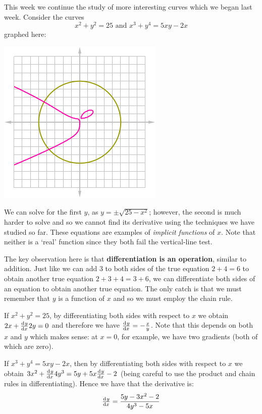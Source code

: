 


This week we continue the study of more interesting curves which we began last week. Consider the curves
\begin{displaymath}
  x^2 + y^2 = 25 \text{ and } x^3 + y^4 = 5xy - 2x
\end{displaymath}
graphed here:
\begin{center}
  \includegraphics[width=0.5\linewidth]{implicit}
\end{center}
We can solve for the first $ y $, as $ y = \pm\sqrt{25 - x^2} $; however, the second is much harder
to solve and so we cannot find its derivative using the techniques we have studied so far. These equations
are examples of \textit{implicit functions} of $ x $. Note that neither is a `real' function since they both fail
the vertical-line test.

The key observation here is that \textbf{differentiation is an operation}, similar to addition. Just like
we can add 3 to both sides of the true equation $ 2 + 4 = 6 $ to obtain another true equation $ 2 + 3 + 4 = 3 + 6 $,
we can differentiate both sides of an equation to obtain another true equation. The only catch is that we must
remember that $ y $ is a function of $ x $ and so we must employ the chain rule.

\begin{ex}
  If $ x^2 + y^2 = 25 $, by differentiating both sides with respect to $ x $ we obtain $ 2x + \od{y}{x} 2y = 0 $ and therefore
  we have $ \od{y}{x} = -\frac{x}{y} $. Note that this depends on both $ x $ and $ y $ which makes sense:
  at $ x = 0 $, for example, we have two gradients (both of which are zero).
\end{ex}

\begin{ex}
  If $ x^3 + y^4 = 5xy - 2x $, then by differentiating both sides with respect to $ x $ we
  obtain $ 3x^2 + \od{y}{x} 4y^3 = 5y + 5x \od{y}{x} - 2 $ (being careful to use the product and chain rules in differentiating). Hence
  we have that the derivative is:
  \begin{displaymath}
    \od{y}{x} = \frac{5y - 3x^2 - 2}{4y^3 - 5x}
  \end{displaymath}
\end{ex}

